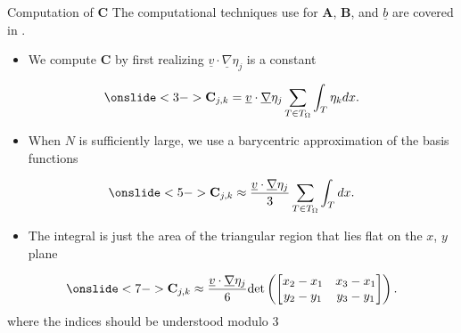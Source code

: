 \documentclass[10pt]{beamer}
\begin{document}
\begin{frame} {Computation of $\mathbf{C}$} \label{ComputationofC}
The computational techniques use for $\mathbf{A}$, $\mathbf{B}$, and $\underline{b}$ are covered in \cite{50LinesofMATLAB}.
\begin{itemize}
\item We compute $\mathbf{C}$ by first realizing $\underline{v} \cdot \underline{\nabla}\eta_{j}$ is a constant
\end{itemize}
\begin{equation}\onslide<3->
\mathbf{C}_{j,k} = \underline{v}\cdot \underline{\nabla}\eta_{j}\sum_{T \in T_{\Omega}}\int_{T}\eta_{k} dx.
\end{equation}

\begin{itemize}
\item When $N$ is sufficiently large, we use a barycentric approximation of the basis functions
\end{itemize}

\begin{equation}\onslide<5->
\mathbf{C}_{j,k} \approx  \frac{\underline{v}\cdot \underline{\nabla}\eta_{j}}{3}\sum_{T \in T_{\Omega}}\int_{T} dx.
\end{equation}

\begin{itemize}
\item The integral is just the area of the triangular region that lies flat on the $x$, $y$ plane
\end{itemize}

\begin{equation}\onslide<7->
 \mathbf{C}_{j,k}\approx \frac{\underline{v}\cdot \underline{\nabla}\eta_{j}}{6}\text{det}\left(\begin{bmatrix}x_{2}-x_{1} & x_{3}-x_{1} \\ y_{2}-y_{1} & y_{3}-y_{1} \end{bmatrix}\right).
\end{equation}
where the indices should be understood modulo 3
\hyperlink{Questions}{}
\end{frame}
\end{document}
